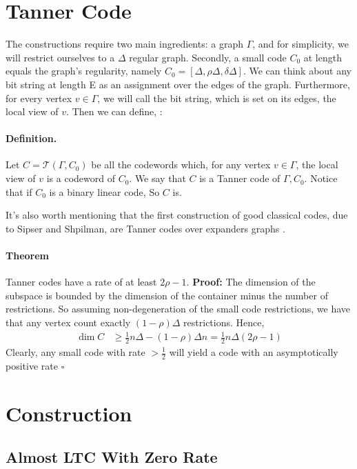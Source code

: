 \documentclass{article}
\begin{document}
\begin{multicols*}{2}
\section{Tanner Code}
The constructions require two main ingredients: a graph $\Gamma$, and for simplicity, we will restrict ourselves to a $\Delta$ regular graph. Secondly, a small code $C_{0}$ at length equals the graph's regularity, namely $C_{0} = [\Delta,\rho\Delta, \delta\Delta]$. We can think about any bit string at length E as an assignment over the edges of the graph. Furthermore, for every vertex $v \in \Gamma$, we will call the bit string, which is set on its edges, the local view of $v$.  Then we can define, \cite{Tanner}:
\paragraph{Definition.}  Let $ C = \mathcal{T}\left( \Gamma, C_{0} \right)$  be all the codewords which, for any vertex $v\in \Gamma$, the local view of $v$ is a codeword of $C_{0}$. We say that $C$ is a Tanner code of $\Gamma, C_{0}$. Notice that if $C_{0}$ is a binary linear code, So $C$ is.  


It's also worth mentioning that the first construction of good classical codes, due to Sipser and Shpilman, are Tanner codes over expanders graphs \cite{ExpanderCodes}.
\paragraph{Theorem} Tanner codes have a rate of at least $2\rho - 1$.
\textbf{Proof:}  The dimension of the subspace is bounded by the dimension of the container minus the number of restrictions. So assuming non-degeneration of the small code restrictions, we have that any vertex count exactly $ \left( 1 - \rho  \right)\Delta $ restrictions. Hence, \begin{equation*}
  \begin{split}
    \dim C & \ge \frac{1}{2}n\Delta - \left( 1-\rho \right)\Delta n = \frac{1}{2}n\Delta\left( 2\rho - 1 \right)  
  \end{split}
\end{equation*} Clearly, any small code with rate $> \frac{1}{2}$ will yield a code with an asymptotically positive rate $\square$ 
  \section{Construction}
\subsection{ Almost LTC With Zero Rate}

\end{multicols*}
\end{document}
